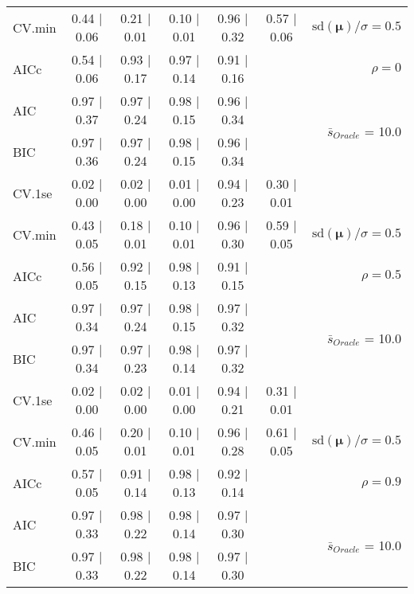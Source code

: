 \begin{table}
\begin{center}
\begin{tabular}{l*{5}{c}|r}
CV.min & 0.44 $\mid$ 0.06 & 0.21 $\mid$ 0.01 & 0.10 $\mid$ 0.01 & 0.96 $\mid$ 0.32 & 0.57 $\mid$ 0.06 &  $\mathrm{sd}(\mathbf{\mu})/\sigma=0.5$ \\
AICc & 0.54 $\mid$ 0.06 & 0.93 $\mid$ 0.17 & 0.97 $\mid$ 0.14 & 0.91 $\mid$ 0.16 & & $\rho=0$ \\
AIC & 0.97 $\mid$ 0.37 & 0.97 $\mid$ 0.24 & 0.98 $\mid$ 0.15 & 0.96 $\mid$ 0.34 & &  \multirow{2}{*}{$\bar{s}_{Oracle}$ = 10.0} \\
BIC & 0.97 $\mid$ 0.36 & 0.97 $\mid$ 0.24 & 0.98 $\mid$ 0.15 & 0.96 $\mid$ 0.34 & &  \\
 \hline 
CV.1se & 0.02 $\mid$ 0.00 & 0.02 $\mid$ 0.00 & 0.01 $\mid$ 0.00 & 0.94 $\mid$ 0.23 & 0.30 $\mid$ 0.01 & \\
CV.min & 0.43 $\mid$ 0.05 & 0.18 $\mid$ 0.01 & 0.10 $\mid$ 0.01 & 0.96 $\mid$ 0.30 & 0.59 $\mid$ 0.05 &  $\mathrm{sd}(\mathbf{\mu})/\sigma=0.5$ \\
AICc & 0.56 $\mid$ 0.05 & 0.92 $\mid$ 0.15 & 0.98 $\mid$ 0.13 & 0.91 $\mid$ 0.15 & & $\rho=0.5$ \\
AIC & 0.97 $\mid$ 0.34 & 0.97 $\mid$ 0.24 & 0.98 $\mid$ 0.15 & 0.97 $\mid$ 0.32 & &  \multirow{2}{*}{$\bar{s}_{Oracle}$ = 10.0} \\
BIC & 0.97 $\mid$ 0.34 & 0.97 $\mid$ 0.23 & 0.98 $\mid$ 0.14 & 0.97 $\mid$ 0.32 & &  \\
 \hline 
CV.1se & 0.02 $\mid$ 0.00 & 0.02 $\mid$ 0.00 & 0.01 $\mid$ 0.00 & 0.94 $\mid$ 0.21 & 0.31 $\mid$ 0.01 & \\
CV.min & 0.46 $\mid$ 0.05 & 0.20 $\mid$ 0.01 & 0.10 $\mid$ 0.01 & 0.96 $\mid$ 0.28 & 0.61 $\mid$ 0.05 &  $\mathrm{sd}(\mathbf{\mu})/\sigma=0.5$ \\
AICc & 0.57 $\mid$ 0.05 & 0.91 $\mid$ 0.14 & 0.98 $\mid$ 0.13 & 0.92 $\mid$ 0.14 & & $\rho=0.9$ \\
AIC & 0.97 $\mid$ 0.33 & 0.98 $\mid$ 0.22 & 0.98 $\mid$ 0.14 & 0.97 $\mid$ 0.30 & &  \multirow{2}{*}{$\bar{s}_{Oracle}$ = 10.0} \\
BIC & 0.97 $\mid$ 0.33 & 0.98 $\mid$ 0.22 & 0.98 $\mid$ 0.14 & 0.97 $\mid$ 0.30 & &  \\
 \hline 
\end{tabular}
\end{center}
\vspace{-1cm}
\end{table}




